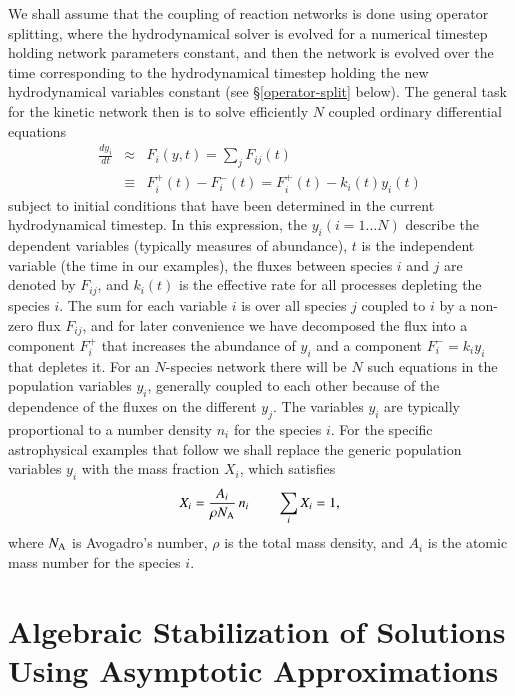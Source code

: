 \documentclass[]{elsart}
\newcommand{\fplus}[1]{F^+_{#1}}
\newcommand{\fminus}[1]{F^-_{#1}}
\newcommand{\tsub}[1]{_{\mbox{\scriptsize#1}}}
\begin{document}
We shall assume that the coupling of reaction networks is done using
operator splitting, where the hydrodynamical solver  is evolved for a numerical timestep
holding network parameters constant, and then the network is evolved over the time
corresponding to the hydrodynamical timestep holding the new hydrodynamical variables
constant (see \S\ref{operator-split} below).  The general task for the kinetic 
network then is to solve efficiently $N$
coupled ordinary differential equations 
\begin{eqnarray}
    \frac{dy_i}{dt} &\approx& F_i(y,t) = \sum_j F_{ij}(t) 
\nonumber
\\
&\equiv& \fplus i (t)- \fminus i(t)
    = \fplus i (t) - k_i(t) y_i(t)
\label{eq1.1}
\end{eqnarray}
subject to initial conditions that have been determined in the current
hydrodynamical timestep. In this expression, the $y_i (i=1
\dots N)$ describe the dependent variables (typically measures of abundance),
$t$ is the independent variable (the time in our examples), the fluxes between
species $i$ and $j$ are denoted by $F_{ij}$, and $k_i(t)$ is the effective rate
for all processes depleting the species $i$.  The sum for each variable $i$ is
over all species $j$ coupled to $i$ by a non-zero flux $F_{ij}$, and for later
convenience we have decomposed the flux into a component $\fplus i$ that
increases the abundance of $y_i$ and a component $\fminus i = k_i y_i$ that
depletes it. For an $N$-species network there will be $N$ such equations in the
population variables $y_i$, generally coupled to each other because of the
dependence of the fluxes on the different $y_j$. The variables $y_i$ are typically
proportional to a number density $n_i$
for the species $i$. For the specific astrophysical examples
that follow we shall replace the generic population variables $y_i$ with the
mass fraction $X_i$, which satisfies
\begin{equation}
X_i  = \frac{A_i}{\rho N\tsub A}\, n_i
\qquad
\sum_i X_i =1,
\label{5.35}
\end{equation}
where $N\tsub A$ is Avogadro's number, $\rho$ is the total mass density, and $A_i$ is the
atomic mass number for the species $i$.



\section{\label{algebraic} Algebraic Stabilization of Solutions Using
Asymptotic Approximations}
\end{document}
